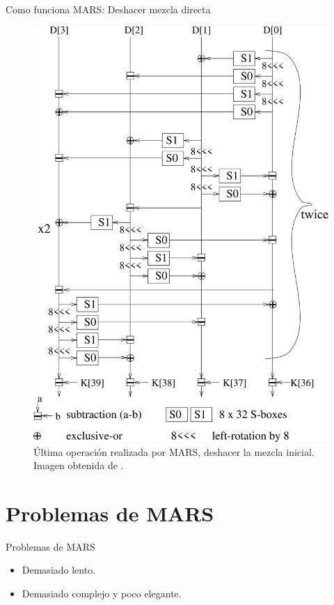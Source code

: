 \documentclass{beamer}
\begin{document}
\begin{frame}{Como funciona MARS: Deshacer mezcla directa}
	\begin{figure}[H]
		\centering
		\includegraphics[scale = 0.38]{deshacer_mezcla.png}
		\caption{Última operación realizada por MARS, deshacer la mezcla inicial. Imagen obtenida de \cite{ampliacionPropuestaMARS}.} \label{fig:undo_mezcla_directa}
	\end{figure}
\end{frame}


\section{Problemas de MARS}
\begin{frame}[allowframebreaks]{Problemas de MARS}

	\begin{itemize}
		\item Demasiado lento.
		\item Demasiado complejo y poco elegante.

	\end{itemize}


\end{frame}
\end{document}
